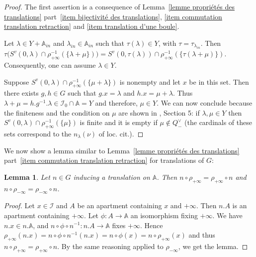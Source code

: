 \documentclass[12pt]{article}
\theoremstyle{plain}
\newtheorem{lemma}[theorem]{Lemma}
\theoremstyle{definition}
\newcommand{\A}{\mathbb{A}}
\newcommand{\I}{\mathcal{I}}
\begin{document}
\begin{proof} The first assertion is a consequence of Lemma~\ref{lemme propriétés des translations} part~\ref{item bijectivité des translations}, \ref{item commutation translation retraction} and \ref{item translation d'une boule}.

Let $\lambda\in Y+\A_{in}$ and $\lambda_{in}\in \A_{in}$ such that $\tau(\lambda)\in Y$, 
with $\tau=\tau_{\lambda_{in}}$. Then 
$\tau\big(S^v(0,\lambda)\cap\rho_{+\infty}^{-1}(\{\lambda+\mu\})\big)=S^v(0,\tau(\lambda))\cap\rho_{+\infty}^{-1} (\{\tau(\lambda+\mu )\})$. Consequently, one can assume $\lambda\in Y$. 

Suppose $S^v(0,\lambda)\cap \rho_{+\infty}^{-1}(\{\mu+\lambda\})$ is nonempty and let $x$ be in this set. Then there exists $g,h\in G$ such that $g.x=\lambda$ and $h.x=\mu+\lambda$. Thus $\lambda+\mu=h.g^{-1}.\lambda\in \I_0\cap \A=Y$ and therefore, $\mu\in Y$. We can now conclude because the finiteness and the condition on  $\mu$ are shown in \cite{gaussent2014spherical}, Section 5: if $\lambda, \mu\in Y$ then $S^v(0,\lambda)\cap \rho_{+\infty}^{-1}(\{\mu\})$ is finite and it is empty if $\mu\notin Q^\vee_-$ (the cardinals of these sets correspond to the $n_\lambda(\nu)$ of loc. cit.).
 
\end{proof}



We now show a lemma similar to Lemma~\ref{lemme propriétés des translations} part~\ref{item commutation translation retraction} for translations of $G$: 

\begin{lemma}\label{lemme commutation des translations et rétractions}
Let $n\in G$ inducing a translation on $\A$. Then $n\circ\rho_{+\infty}=\rho_{+\infty}\circ n$ and $n\circ \rho_{-\infty}=\rho_{-\infty}\circ n$.
\end{lemma}

\begin{proof} 
Let $x\in\mathcal{I}$ and $A$ be an apartment containing $x$ and $+\infty$. Then $n.A$ is an apartment containing $+\infty$. Let $\phi:A\rightarrow \mathbb{A}$ an isomorphism fixing $+\infty$. We have $n.x\in n.\mathbb{A}$, and $n\circ\phi\circ n^{-1}:n.A\rightarrow \mathbb{A}$ fixes $+\infty$. Hence $\rho_{+\infty}(n.x)=n\circ\phi\circ n^{-1}(n.x)=n\circ\phi(x)=n\circ\rho_{+\infty}(x)$ and thus $n\circ \rho_{+\infty}=\rho_{+\infty}\circ n$. By the same reasoning applied to $\rho_{-\infty}$, we get the lemma.  
 \end{proof}
 
\end{document}
